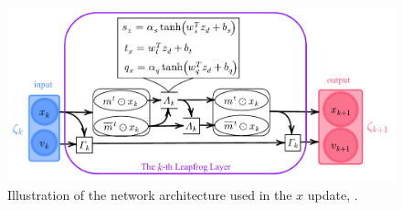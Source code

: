 \documentclass{article} %
\begin{document}
\begin{figure}[htpb]
   \centering
   \includegraphics[width=\textwidth]{figures/network_updated5.pdf}
   \caption{\label{fig:network}Illustration of the network architecture used in the \(x\) update, .}
\end{figure}
\end{document}
